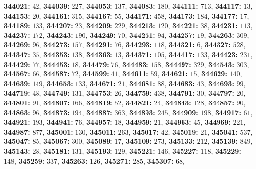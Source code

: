 \textsf{\bfseries 344021:} $42$, \textsf{\bfseries 344039:} $227$, \textsf{\bfseries 344053:} $137$, \textsf{\bfseries 344083:} $180$, \textsf{\bfseries 344111:} $713$, \textsf{\bfseries 344117:} $13$, \textsf{\bfseries 344153:} $20$, \textsf{\bfseries 344161:} $315$, \textsf{\bfseries 344167:} $55$, \textsf{\bfseries 344171:} $458$, \textsf{\bfseries 344173:} $184$, \textsf{\bfseries 344177:} $17$, \textsf{\bfseries 344189:} $133$, \textsf{\bfseries 344207:} $23$, \textsf{\bfseries 344209:} $229$, \textsf{\bfseries 344213:} $120$, \textsf{\bfseries 344221:} $38$, \textsf{\bfseries 344231:} $113$, \textsf{\bfseries 344237:} $172$, \textsf{\bfseries 344243:} $190$, \textsf{\bfseries 344249:} $70$, \textsf{\bfseries 344251:} $94$, \textsf{\bfseries 344257:} $19$, \textsf{\bfseries 344263:} $309$, \textsf{\bfseries 344269:} $96$, \textsf{\bfseries 344273:} $157$, \textsf{\bfseries 344291:} $76$, \textsf{\bfseries 344293:} $118$, \textsf{\bfseries 344321:} $6$, \textsf{\bfseries 344327:} $528$, \textsf{\bfseries 344347:} $35$, \textsf{\bfseries 344353:} $138$, \textsf{\bfseries 344363:} $13$, \textsf{\bfseries 344371:} $105$, \textsf{\bfseries 344417:} $133$, \textsf{\bfseries 344423:} $231$, \textsf{\bfseries 344429:} $77$, \textsf{\bfseries 344453:} $18$, \textsf{\bfseries 344479:} $76$, \textsf{\bfseries 344483:} $158$, \textsf{\bfseries 344497:} $329$, \textsf{\bfseries 344543:} $303$, \textsf{\bfseries 344567:} $66$, \textsf{\bfseries 344587:} $72$, \textsf{\bfseries 344599:} $41$, \textsf{\bfseries 344611:} $59$, \textsf{\bfseries 344621:} $15$, \textsf{\bfseries 344629:} $140$, \textsf{\bfseries 344639:} $149$, \textsf{\bfseries 344653:} $133$, \textsf{\bfseries 344671:} $21$, \textsf{\bfseries 344681:} $88$, \textsf{\bfseries 344683:} $43$, \textsf{\bfseries 344693:} $99$, \textsf{\bfseries 344719:} $48$, \textsf{\bfseries 344749:} $131$, \textsf{\bfseries 344753:} $26$, \textsf{\bfseries 344759:} $438$, \textsf{\bfseries 344791:} $30$, \textsf{\bfseries 344797:} $20$, \textsf{\bfseries 344801:} $91$, \textsf{\bfseries 344807:} $166$, \textsf{\bfseries 344819:} $52$, \textsf{\bfseries 344821:} $24$, \textsf{\bfseries 344843:} $128$, \textsf{\bfseries 344857:} $90$, \textsf{\bfseries 344863:} $96$, \textsf{\bfseries 344873:} $194$, \textsf{\bfseries 344887:} $363$, \textsf{\bfseries 344893:} $245$, \textsf{\bfseries 344909:} $198$, \textsf{\bfseries 344917:} $61$, \textsf{\bfseries 344921:} $193$, \textsf{\bfseries 344941:} $76$, \textsf{\bfseries 344957:} $18$, \textsf{\bfseries 344959:} $21$, \textsf{\bfseries 344963:} $45$, \textsf{\bfseries 344969:} $221$, \textsf{\bfseries 344987:} $877$, \textsf{\bfseries 345001:} $130$, \textsf{\bfseries 345011:} $263$, \textsf{\bfseries 345017:} $42$, \textsf{\bfseries 345019:} $21$, \textsf{\bfseries 345041:} $537$, \textsf{\bfseries 345047:} $85$, \textsf{\bfseries 345067:} $300$, \textsf{\bfseries 345089:} $17$, \textsf{\bfseries 345109:} $273$, \textsf{\bfseries 345133:} $212$, \textsf{\bfseries 345139:} $849$, \textsf{\bfseries 345143:} $28$, \textsf{\bfseries 345181:} $131$, \textsf{\bfseries 345193:} $129$, \textsf{\bfseries 345221:} $146$, \textsf{\bfseries 345227:} $118$, \textsf{\bfseries 345229:} $148$, \textsf{\bfseries 345259:} $337$, \textsf{\bfseries 345263:} $126$, \textsf{\bfseries 345271:} $285$, \textsf{\bfseries 345307:} $68$, 

